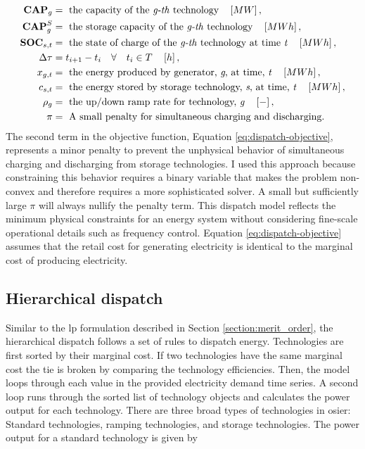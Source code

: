 \begin{align}
    \textbf{CAP}_g &= \text{ the capacity of the \textit{g-th} technology}\quad \left[MW\right],\nonumber\\
    \textbf{CAP}^S_g &= \text{ the storage capacity of the \textit{g-th} technology}\quad \left[MWh\right],\nonumber\\
    \textbf{SOC}_{s,t} &= \text{ the state of charge of the \textit{g-th} technology at time \textit{t}}\quad \left[MWh\right]\nonumber,\\
    \Delta\tau &= t_{i+1} - t_i \quad \forall \quad t_i \in T \quad \left[h\right],\nonumber\\
    x_{g,t} &= \text{ the energy produced by generator, \textit{g}, at time, \textit{t}}\quad \left[MWh\right]\nonumber,\\
    c_{s,t} &= \text{ the energy stored by storage technology, \textit{s}, at time, \textit{t}}\quad \left[MWh\right]\nonumber,\\
    \rho_g &= \text{ the up/down ramp rate for technology, \textit{g}} \quad \left[-\right]\nonumber,\\
    \pi &= \text{ A small penalty for simultaneous charging and discharging.}\nonumber
\end{align}
The second term in the objective function, Equation \ref{eq:dispatch-objective},
represents a minor penalty to prevent the unphysical behavior of simultaneous
charging and discharging from storage technologies. I used this approach because
constraining this behavior requires a binary variable that makes the problem
non-convex and therefore requires a more sophisticated solver. A small but
sufficiently large $\pi$ will always nullify the penalty term. This dispatch
model reflects the minimum physical constraints for an energy system without
considering fine-scale operational details such as frequency control. Equation
\ref{eq:dispatch-objective} assumes that the retail cost for generating
electricity is identical to the marginal cost of producing electricity. 

\subsection{Hierarchical dispatch}

Similar to the \ac{lp} formulation described in Section
\ref{section:merit_order}, the hierarchical dispatch follows a set of rules to
dispatch energy. Technologies are first sorted by their marginal cost. If two
technologies have the same marginal cost the tie is broken by comparing the 
technology efficiencies. Then, the model loops through each value in the provided 
electricity demand time series. A second loop runs through the sorted list of 
technology objects and calculates the power output for each technology. There
are three broad types of technologies in \ac{osier}: Standard technologies,
ramping technologies, and storage technologies. The power output for a standard
technology is given by

